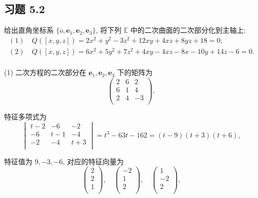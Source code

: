 \documentclass{ctexart}
\begin{document}
\subsection{习题 5.2}
\begin{exercise}%
    给出直角坐标系 $\{\dot{o},\boldsymbol{e}_1,\boldsymbol{e}_2,\boldsymbol{e}_3\}$, 将下列 $\mathbb{E}$ 中的二次曲面的二次部分化到主轴上:
    \begin{align*}
        (1) &\ Q([x,y,z])=2x^2+y^2-3z^2+12xy+4xz+8yz+18=0; \\
        (2) &\ Q([x,y,z])=6x^2+5y^2+7z^2+4xy-4xz-8x-10y+14z-6=0. \\
    \end{align*}
\end{exercise}
\begin{solution}
    (1) 二次方程的二次部分在 $\boldsymbol{e}_1,\boldsymbol{e}_2,\boldsymbol{e}_3$ 下的矩阵为
    \[\begin{pmatrix}
        2 & 6 & 2 \\
        6 & 1 & 4 \\
        2 & 4 & -3 \\
    \end{pmatrix},\]

    特征多项式为
    \[\begin{vmatrix}
        t-2 & -6 & -2 \\
        -6 & t-1 & -4 \\
        -2 & -4 & t+3 \\
    \end{vmatrix}=t^3-63t-162=(t-9)(t+3)(t+6),\]

    特征值为 $9,-3,-6$, 对应的特征向量为
    \[\begin{pmatrix}
        2 \\
        2 \\
        1 \\
    \end{pmatrix},\quad\begin{pmatrix}
        -2 \\
        1 \\
        2 \\
    \end{pmatrix},\quad\begin{pmatrix}
        1 \\
        -2 \\
        2 \\
    \end{pmatrix},\]


\end{solution}
\end{document}
